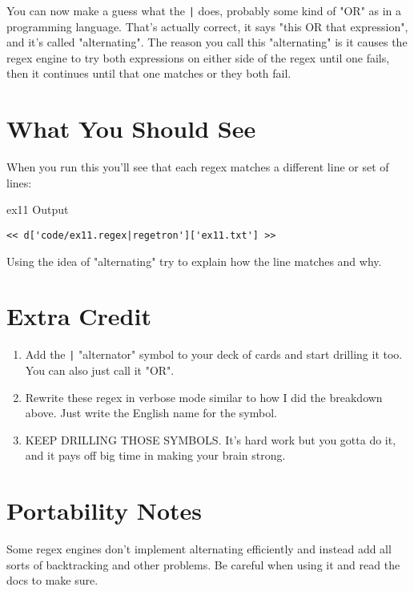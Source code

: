 You can now make a guess what the \verb,|, does, probably some kind of "OR" as
in a programming language.  That's actually correct, it says "this OR that expression", and it's called "alternating".  The reason you call this "alternating" is it
causes the regex engine to try both expressions on either side of the regex until
one fails, then it continues until that one matches or they both fail.

\section{What You Should See}

When you run this you'll see that each regex matches a different line or
set of lines:

\begin{code}{ex11 Output}
\begin{Verbatim}
<< d['code/ex11.regex|regetron']['ex11.txt'] >>
\end{Verbatim}
\end{code}

Using the idea of "alternating" try to explain how the line matches and why.

\section{Extra Credit}

\begin{enumerate}
\item Add the \verb,|, "alternator" symbol to your deck of cards and start drilling
    it too.  You can also just call it "OR".
\item Rewrite these regex in verbose mode similar to how I did the breakdown above.
    Just write the English name for the symbol.
\item KEEP DRILLING THOSE SYMBOLS.  It's hard work but you gotta do it, and it 
    pays off big time in making your brain strong.
\end{enumerate}

\section{Portability Notes}

Some regex engines don't implement alternating efficiently and instead add all
sorts of backtracking and other problems.  Be careful when using it and read
the docs to make sure.
